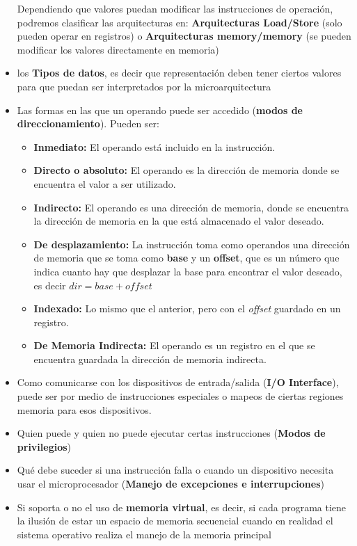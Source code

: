 \begin{itemize}
	Dependiendo que valores puedan modificar las instrucciones de operación, podremos clasificar las arquitecturas en: \textbf{Arquitecturas Load/Store} (solo pueden operar en registros) o \textbf{Arquitecturas memory/memory} (se pueden modificar los valores directamente en memoria)
	\item los \textbf{Tipos de datos}, es decir que representación deben tener ciertos valores para que puedan ser interpretados por la microarquitectura
	\item Las formas en las que un operando puede ser accedido (\textbf{modos de direccionamiento}). Pueden ser:
	\begin{itemize}
		\item \textbf{Inmediato:} El operando está incluido en la instrucción.
		\item \textbf{Directo o absoluto:} El operando es la dirección de memoria donde se encuentra el valor a ser utilizado.
		\item \textbf{Indirecto:} El operando es una dirección de memoria, donde se encuentra la dirección de memoria en la que está almacenado el valor deseado.
		\item \textbf{De desplazamiento:} La instrucción toma como operandos una dirección de memoria que se toma como \textbf{base} y un \textbf{offset}, que es un número que indica cuanto hay que desplazar la base para encontrar el valor deseado, es decir $dir = base + offset$
		\item \textbf{Indexado:} Lo mismo que el anterior, pero con el \textit{offset} guardado en un registro.
		\item \textbf{De Memoria Indirecta:} El operando es un registro en el que se encuentra guardada la dirección de memoria indirecta.
	\end{itemize}
	\item Como comunicarse con los dispositivos de entrada/salida (\textbf{I/O Interface}), puede ser por medio de instrucciones especiales o mapeos de ciertas regiones memoria para esos dispositivos.
	\item Quien puede y quien no puede ejecutar certas instrucciones (\textbf{Modos de privilegios})
	\item Qué debe suceder si una instrucción falla o cuando un dispositivo necesita usar el microprocesador (\textbf{Manejo de excepciones e interrupciones})
	\item Si soporta o no el uso de \textbf{memoria virtual}, es decir, si cada programa tiene la ilusión de estar un espacio de memoria secuencial cuando en realidad el sistema operativo realiza el manejo de la memoria principal
\end{itemize}


